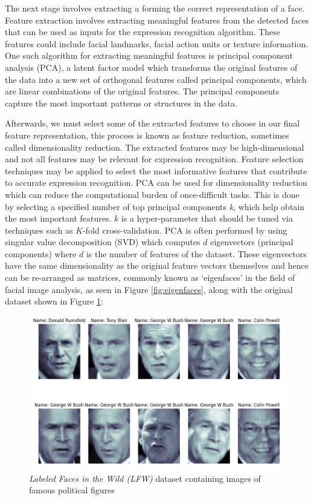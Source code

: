 \documentclass[12pt, a4paper]{article}
\newcommand{\np}
    {
    \vskip 0.4cm
    }
\begin{document}
The next stage involves extracting a forming the correct representation of a face. Feature extraction involves extracting meaningful features from the detected faces that can be used as inputs for the expression recognition algorithm. These features could include facial landmarks, facial action units or texture information. One such algorithm for extracting meaningful features is principal component analysis (PCA), a latent factor model which transforms the original features of the data into a new set of orthogonal features called principal components, which are linear combinations of the original features. The principal components capture the most important patterns or structures in the data.
\np
Afterwards, we must select some of the extracted features to choose in our final feature representation, this process is known as feature reduction, sometimes called dimensionality reduction. The extracted features may be high-dimensional and not all features may be relevant for expression recognition. Feature selection techniques may be applied to select the most informative features that contribute to accurate expression recognition. PCA can be used for dimensionality reduction which can reduce the computational burden of once-difficult tasks. This is done by selecting a specified number of top principal components \textit{k}, which help obtain the most important features. $k$ is a hyper-parameter that should be tuned via techniques such as $K$-fold cross-validation. PCA is often performed by using singular value decomposition (SVD) which computes $d$ eigenvectors (principal components) where $d$ is the number of features of the dataset. These eigenvectors have the same dimensionality as the original feature vectors themselves and hence can be re-arranged as matrices, commonly known as `eigenfaces' in the field of facial image analysis, as seen in Figure \ref{fig:eigenfaces}, along with the original dataset shown in Figure \ref{fig:presidents}:

\begin{figure}[H]
    \centering
    \includegraphics[scale=0.55]{images/presidents.png}
    \caption{\textit{Labeled Faces in the Wild (LFW)} dataset containing images of famous political figures}
    \label{fig:presidents}
\end{figure}
\end{document}
